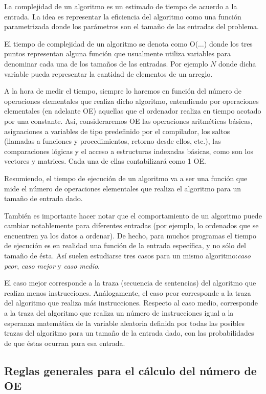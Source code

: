 La complejidad de un algoritmo es un estimado de tiempo de acuerdo a la entrada. La idea es representar la eficiencia del algoritmo como una función parametrizada donde los parámetros son el tamaño de las entradas del problema.

El tiempo de complejidad de un algoritmo se denota como O($\dots$) donde los tres puntos representan alguna función que usualmente utiliza variables para denominar cada una de los tamaños de las entradas. Por ejemplo $N$ donde dicha variable pueda representar la cantidad de elementos de un arreglo.

A la hora de medir el tiempo, siempre lo haremos en función del número de
operaciones elementales que realiza dicho algoritmo, entendiendo por operaciones
elementales (en adelante OE) aquellas que el ordenador realiza en tiempo acotado
por una constante. Así, consideraremos OE las operaciones aritméticas básicas,
asignaciones a variables de tipo predefinido por el compilador, los saltos (llamadas
a funciones y procedimientos, retorno desde ellos, etc.), las comparaciones lógicas
y el acceso a estructuras indexadas básicas, como son los vectores y matrices. Cada
una de ellas contabilizará como 1 OE.

Resumiendo, el tiempo de ejecución de un algoritmo va a ser una función que
mide el número de operaciones elementales que realiza el algoritmo para un
tamaño de entrada dado.

También es importante hacer notar que el comportamiento de un algoritmo
puede cambiar notablemente para diferentes entradas (por ejemplo, lo ordenados
que se encuentren ya los datos a ordenar). De hecho, para muchos programas el
tiempo de ejecución es en realidad una función de la entrada específica, y no sólo
del tamaño de ésta. Así suelen estudiarse tres casos para un mismo algoritmo:\emph{caso peor}, \emph{caso mejor} y \emph{caso medio}.

El caso mejor corresponde a la traza (secuencia de sentencias) del algoritmo que
 realiza menos instrucciones. Análogamente, el caso peor corresponde a la traza del
 algoritmo que realiza más instrucciones. Respecto al caso medio, corresponde a la
traza del algoritmo que realiza un número de instrucciones igual a la esperanza
matemática de la variable aleatoria definida por todas las posibles trazas del
algoritmo para un tamaño de la entrada dado, con las probabilidades de que éstas
ocurran para esa entrada.

\subsection{Reglas generales para el cálculo del número de OE}

